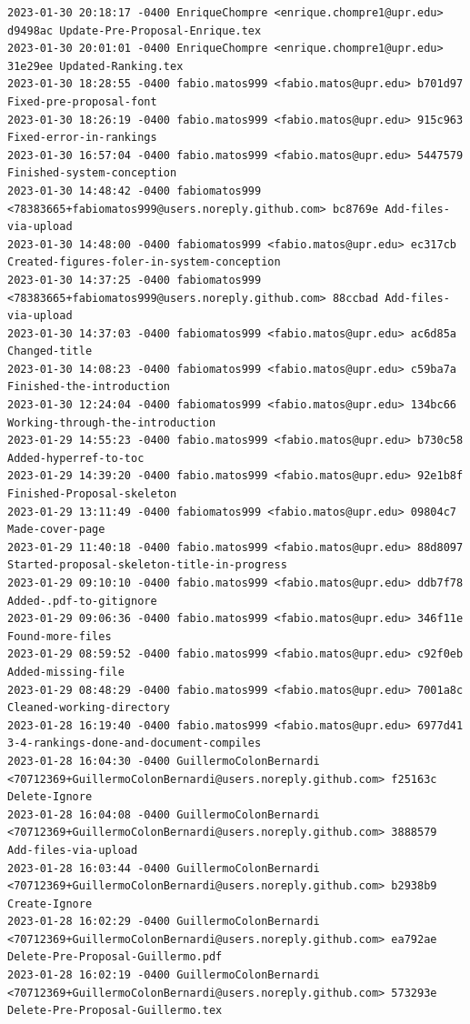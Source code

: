 \documentclass[12pt]{article}
\begin{document}
\begin{lstlisting}
2023-01-30 20:18:17 -0400 EnriqueChompre <enrique.chompre1@upr.edu> d9498ac Update-Pre-Proposal-Enrique.tex
2023-01-30 20:01:01 -0400 EnriqueChompre <enrique.chompre1@upr.edu> 31e29ee Updated-Ranking.tex
2023-01-30 18:28:55 -0400 fabio.matos999 <fabio.matos@upr.edu> b701d97 Fixed-pre-proposal-font
2023-01-30 18:26:19 -0400 fabio.matos999 <fabio.matos@upr.edu> 915c963 Fixed-error-in-rankings
2023-01-30 16:57:04 -0400 fabio.matos999 <fabio.matos@upr.edu> 5447579 Finished-system-conception
2023-01-30 14:48:42 -0400 fabiomatos999 <78383665+fabiomatos999@users.noreply.github.com> bc8769e Add-files-via-upload
2023-01-30 14:48:00 -0400 fabiomatos999 <fabio.matos@upr.edu> ec317cb Created-figures-foler-in-system-conception
2023-01-30 14:37:25 -0400 fabiomatos999 <78383665+fabiomatos999@users.noreply.github.com> 88ccbad Add-files-via-upload
2023-01-30 14:37:03 -0400 fabiomatos999 <fabio.matos@upr.edu> ac6d85a Changed-title
2023-01-30 14:08:23 -0400 fabiomatos999 <fabio.matos@upr.edu> c59ba7a Finished-the-introduction
2023-01-30 12:24:04 -0400 fabiomatos999 <fabio.matos@upr.edu> 134bc66 Working-through-the-introduction
2023-01-29 14:55:23 -0400 fabio.matos999 <fabio.matos@upr.edu> b730c58 Added-hyperref-to-toc
2023-01-29 14:39:20 -0400 fabio.matos999 <fabio.matos@upr.edu> 92e1b8f Finished-Proposal-skeleton
2023-01-29 13:11:49 -0400 fabiomatos999 <fabio.matos@upr.edu> 09804c7 Made-cover-page
2023-01-29 11:40:18 -0400 fabio.matos999 <fabio.matos@upr.edu> 88d8097 Started-proposal-skeleton-title-in-progress
2023-01-29 09:10:10 -0400 fabio.matos999 <fabio.matos@upr.edu> ddb7f78 Added-.pdf-to-gitignore
2023-01-29 09:06:36 -0400 fabio.matos999 <fabio.matos@upr.edu> 346f11e Found-more-files
2023-01-29 08:59:52 -0400 fabio.matos999 <fabio.matos@upr.edu> c92f0eb Added-missing-file
2023-01-29 08:48:29 -0400 fabio.matos999 <fabio.matos@upr.edu> 7001a8c Cleaned-working-directory
2023-01-28 16:19:40 -0400 fabio.matos999 <fabio.matos@upr.edu> 6977d41 3-4-rankings-done-and-document-compiles
2023-01-28 16:04:30 -0400 GuillermoColonBernardi <70712369+GuillermoColonBernardi@users.noreply.github.com> f25163c Delete-Ignore
2023-01-28 16:04:08 -0400 GuillermoColonBernardi <70712369+GuillermoColonBernardi@users.noreply.github.com> 3888579 Add-files-via-upload
2023-01-28 16:03:44 -0400 GuillermoColonBernardi <70712369+GuillermoColonBernardi@users.noreply.github.com> b2938b9 Create-Ignore
2023-01-28 16:02:29 -0400 GuillermoColonBernardi <70712369+GuillermoColonBernardi@users.noreply.github.com> ea792ae Delete-Pre-Proposal-Guillermo.pdf
2023-01-28 16:02:19 -0400 GuillermoColonBernardi <70712369+GuillermoColonBernardi@users.noreply.github.com> 573293e Delete-Pre-Proposal-Guillermo.tex

\end{lstlisting}
\end{document}
